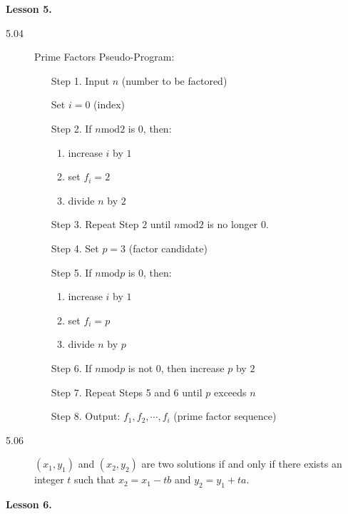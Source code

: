 \documentclass{article}
\begin{document}
\textbf{Lesson 5.}

\begin{description}
\item[5.04] Prime Factors Pseudo-Program:
  \begin{itemize}
  \item[Step 1.] Input $n$ (number to be factored)

         Set $i = 0$ (index)
  \item[Step 2.] If $n \text{mod} 2$ is $0$, then:
    \begin{enumerate}[(1)]
      \item increase $i$ by $1$
      \item set $f_i = 2$
      \item divide $n$ by $2$
    \end{enumerate}
  \item[Step 3.] Repeat Step 2 until $n \text{mod} 2$ is no longer $0$.
  \item[Step 4.] Set $p = 3$ (factor candidate)
  \item[Step 5.] If $n \text{mod} p$ is $0$, then:
    \begin{enumerate}[(1)]
      \item increase $i$ by $1$
      \item set $f_i = p$
      \item divide $n$ by $p$
    \end{enumerate}
  \item[Step 6.] If $n \text{mod} p$ is not $0$, then increase $p$ by $2$
  \item[Step 7.] Repeat Steps 5 and 6 until $p$ exceeds $n$
  \item[Step 8.] Output: $f_1, f_2, \cdots , f_i$ (prime factor sequence)
  \end{itemize}
\item[5.06] $(x_1, y_1)$ and $(x_2, y_2)$ are two solutions if and only if there exists an integer $t$ such that $x_2=x_1-tb$ and $y_2=y_1+ta$.
\end{description}
\vspace{0.3cm}

\textbf{Lesson 6.}
\end{document}
